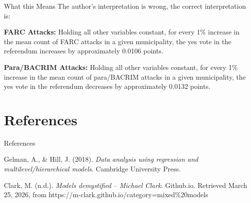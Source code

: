 \documentclass{beamer}
\begin{document}
	\begin{frame}{What this Means}
			The author's interpretation is wrong, the correct interpretation is:
		
			\textbf{FARC Attacks:} Holding all other variables constant, for every 1\% increase in the mean count of FARC attacks in a given municipality, the yes vote in the referendum increases by approximately 0.0106 points.
			
			\textbf{Para/BACRIM Attacks:} Holding all other variables constant, for every 1\% increase in the mean count of para/BACRIM attacks in a given municipality, the yes vote in the referendum decreases by approximately 0.0132 points.
		
	\end{frame}
	
	\section{References}
	
	\begin{frame}{References}
	
	Gelman, A., \& Hill, J. (2018). \textit{Data analysis using regression and multilevel/hierarchical models}. Cambridge University Press.
	
	\vspace{0.2cm}
	
	Clark, M. (n.d.). \textit{Models demystified -- Michael Clark}. Github.io. 
	Retrieved March 25, 2026, from https://m-clark.github.io/category=mixed\%20models
	
	\end{frame}
	
\end{document}
